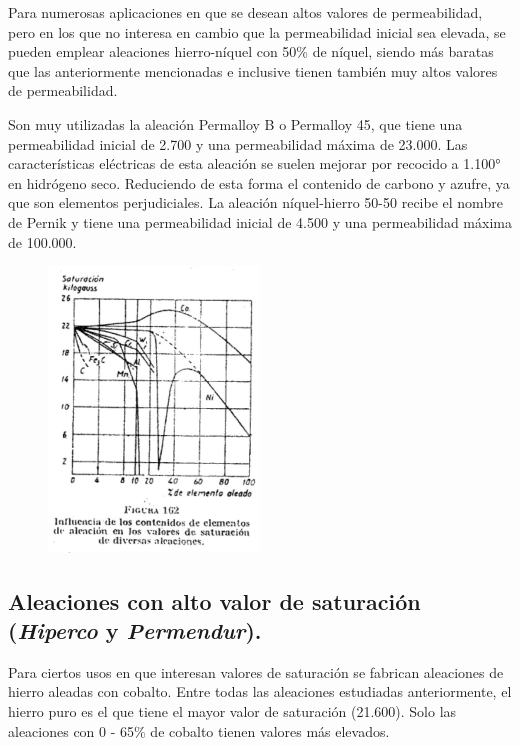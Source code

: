 \documentclass[12pt,a4paper]{article}
\begin{document}
Para numerosas aplicaciones en que se desean altos valores de permeabilidad, pero en los que no interesa en cambio que la permeabilidad inicial sea elevada, se pueden emplear aleaciones hierro-níquel con 50\% de níquel, siendo más baratas que las anteriormente mencionadas e inclusive tienen también muy altos valores de permeabilidad.

Son muy utilizadas la aleación Permalloy B o Permalloy 45, que tiene una permeabilidad inicial de 2.700 y una permeabilidad máxima de 23.000. Las características eléctricas de esta aleación se suelen mejorar por recocido a 1.100° en hidrógeno seco. Reduciendo de esta forma el contenido de carbono y azufre, ya que son elementos perjudiciales. La aleación níquel-hierro 50-50 recibe el nombre de Pernik y tiene una permeabilidad inicial de 4.500 y una permeabilidad máxima de 100.000.

\begin{figure}[H]    
    \centering         
    \includegraphics[width=0.5\textwidth]{IMAGENES LATEX/8.jpg}
\end{figure}

\subsection{Aleaciones con alto valor de saturación (\textit{Hiperco} y \textit{Permendur}).}

Para ciertos usos en que interesan valores de saturación se fabrican aleaciones de hierro aleadas con cobalto. Entre todas las aleaciones estudiadas anteriormente, el hierro puro es el que tiene el mayor valor de saturación (21.600). Solo las aleaciones con 0 - 65\% de cobalto tienen valores más elevados.
\end{document}
